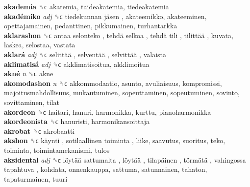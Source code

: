 \textbf{akademia} ␝ϲ  akatemia, taideakatemia, tiedeakatemia  \\
\textbf{akadémiko} \emph{adj}  ␝ϲ   tiedekunnan jäsen , akateemikko, akateeminen, opettajamainen, pedanttinen, pikkumainen, turhantarkka  \\
\textbf{aklarashon} ␝ϲ   antaa selonteko ,  tehdä selkoa ,  tehdä tili ,  tilittää , kuvata, laskea, selostaa, vastata  \\
\textbf{aklará} \emph{adj}  ␝ϲ   selittää ,  selventää ,  selvittää , valaista  \\
\textbf{aklimatisá} \emph{adj}  ␝ϲ  akklimatisoitua, akklimoitua  \\
\textbf{akné} \emph{n}  ␝ϲ  akne  \\
\textbf{akomodashon} \emph{n}  ␝ϲ  akkommodaatio, asunto, avuliaisuus, kompromissi, majoitusmahdollisuus, mukautuminen, sopeuttaminen, sopeutuminen, sovinto, sovittaminen, tilat  \\
\textbf{akordeon} ␝ϲ  haitari, hanuri, harmonikka, kurttu, pianoharmonikka  \\
\textbf{akordeonista} ␝ϲ  hanuristi, harmonikansoittaja  \\
\textbf{akrobat} ␝ϲ  akrobaatti  \\
\textbf{akshon} ␝ϲ   käynti ,  sotilaallinen toiminta , liike, saavutus, suoritus, teko, toiminta, toimintamekanismi, tulos  \\
\textbf{aksidental} \emph{adj}  ␝ϲ   löytää sattumalta ,  löytää ,  tilapäinen ,  törmätä ,  vahingossa tapahtuva , kohdata, onnenkauppa, sattuma, satunnainen, tahaton, tapaturmainen, tuuri  \\
